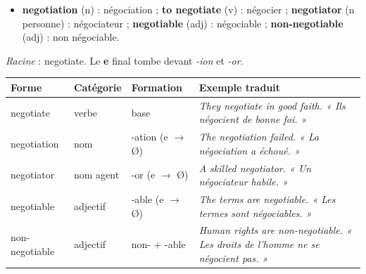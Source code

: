 \documentclass[11pt]{article}
\newcommand{\cle}[1]{{\popxbold\color{popdark}#1}}
\newcommand{\eng}[1]{\ifmmode\text{\textit{#1}}\else\begingroup\selectlanguage{english}\itshape #1\endgroup\fi}
\begin{document}
\begin{definition}[Glossaire]
\begin{itemize}
\item \textbf{negotiation} (n) : négociation ; \textbf{to negotiate} (v) : négocier ; \textbf{negotiator} (n personne) : négociateur ; \textbf{negotiable} (adj) : négociable ; \textbf{non-negotiable} (adj) : non négociable.
\end{itemize}
\end{definition}

\begin{propriete}
\emph{Racine} : \cle{negotiate}. Le \textbf{e} final tombe devant \emph{-ion} et \emph{-or}.
\begin{center}
\begin{tabularx}{\linewidth}{|X|X|X|X|}
\hline
\rowcolor{popblueL}
\textbf{Forme} & \textbf{Catégorie} & \textbf{Formation} & \textbf{Exemple traduit} \\
\hline
negotiate & verbe & base & \eng{They negotiate in good faith.} « Ils négocient de bonne foi. » \\
\hline
negotiation & nom & -ation (e $\to$ Ø) & \eng{The negotiation failed.} « La négociation a échoué. » \\
\hline
negotiator & nom agent & -or (e $\to$ Ø) & \eng{A skilled negotiator.} « Un négociateur habile. » \\
\hline
negotiable & adjectif & -able (e $\to$ Ø) & \eng{The terms are negotiable.} « Les termes sont négociables. » \\
\hline
non-negotiable & adjectif & non- + -able & \eng{Human rights are non-negotiable.} « Les droits de l'homme ne se négocient pas. » \\
\hline
\end{tabularx}
\end{center}
\end{propriete}
\end{document}
